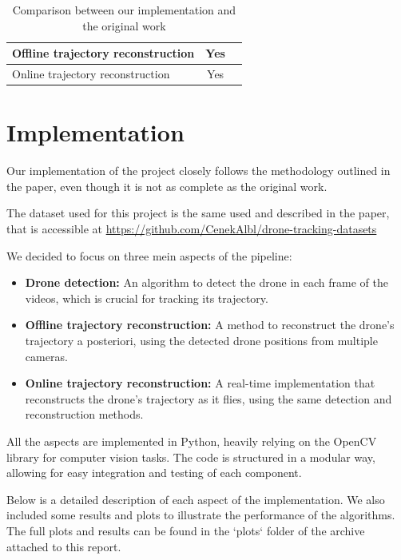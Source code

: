 \documentclass[11pt]{article}
\begin{document}
\begin{table}[H]
\begin{tabularx}{\textwidth}{|Y|c|Y|}
        Offline trajectory reconstruction               & Yes                  &                                                                                                                    \\\hline
        Online trajectory reconstruction                & Yes                  &                                                                                                                    \\\hline
    \end{tabularx}
    \caption{Comparison between our implementation and the original work}
    \label{tab:comparison}
\end{table}

\section{Implementation}

Our implementation of the project closely follows the methodology outlined in the paper, even though it is not as complete as the original work.

The dataset used for this project is the same used and described in the paper, that is accessible at \url{https://github.com/CenekAlbl/drone-tracking-datasets}

We decided to focus on three mein aspects of the pipeline:

\begin{itemize}
    \item \textbf{Drone detection:} An algorithm to detect the drone in each frame of the videos, which is crucial for tracking its trajectory.
    \item \textbf{Offline trajectory reconstruction:} A method to reconstruct the drone's trajectory a posteriori, using the detected drone positions from multiple cameras.
    \item \textbf{Online trajectory reconstruction:} A real-time implementation that reconstructs the drone's trajectory as it flies, using the same detection and reconstruction methods.
\end{itemize}

All the aspects are implemented in Python, heavily relying on the OpenCV library for computer vision tasks. The code is structured in a modular way, allowing for easy integration and testing of each component.

Below is a detailed description of each aspect of the implementation. We also included some results and plots to illustrate the performance of the algorithms. The full plots and results can be found in the `plots` folder of the archive attached to this report.
\end{document}
